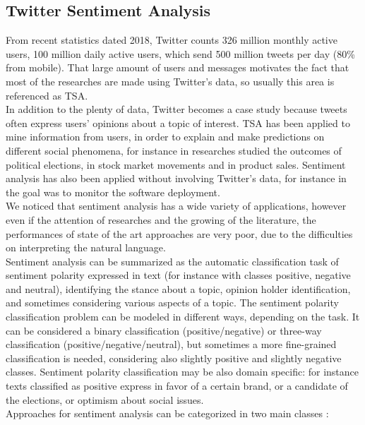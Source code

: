 \subsection{Twitter Sentiment Analysis}
From recent statistics dated 2018, Twitter counts 326 million monthly active users, 100 million daily active users, which send 500 million tweets per day (80\% from mobile). That large amount of users and messages motivates the fact that most of the researches are made using Twitter's data, so usually this area is referenced as \ac{TSA}.\\
In addition to the plenty of data, Twitter becomes a case study because tweets often express users' opinions about a topic of interest. \ac{TSA} has been applied to mine information from users, in order to explain and make predictions on different social phenomena, for instance in \cite{bermingham-smeaton-2011-using} researches studied the outcomes of political elections, in \cite{bollen2011twitter} stock market movements and in \cite{Rui:2013:WCM:2528554.2528633} product sales. Sentiment analysis has also been applied without involving Twitter's data, for instance in \cite{JURADO201582} the goal was to monitor the software deployment.\\
We noticed that sentiment analysis has a wide variety of applications, however even if the attention of researches and the growing of the literature, the performances of state of the art approaches are very poor, due to the difficulties on interpreting the natural language.\\
Sentiment analysis can be summarized as the automatic classification task of sentiment polarity expressed in text (for instance with classes positive, negative and neutral), identifying the stance about a topic, opinion holder identification, and sometimes considering various aspects of a topic. The sentiment polarity classification problem can be modeled in different ways, depending on the task. It can be considered a binary classification (positive/negative) or three-way classification (positive/negative/neutral), but sometimes a more fine-grained classification is needed, considering also slightly positive and slightly negative classes. Sentiment polarity classification may be also domain specific: for instance texts classified as positive express in favor of a certain brand, or a candidate of the elections, or optimism about social issues.\\
Approaches for sentiment analysis can be categorized in two main classes \cite{Zimbra:2018:STS:3210372.3185045}:
